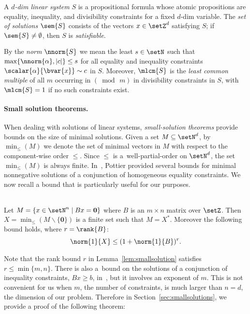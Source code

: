 A \emph{$d$-dim linear system} $S$
is a propositional formula whose atomic propositions are 
equality, inequality, and divisibility constraints for a fixed
$d$-dim variable.
The \emph{set of solutions} $\sem{S}$ 
 consists of the vectors $x\in\setZ^d$
satisfying $S$; if $\sem{S}\neq\emptyset$, then 
$S$ is \emph{satisfiable}. 

By the \emph{norm}
$\nnorm{S}$ we mean the least $s\in\setN$ such that 
$\max\{\nnorm{\alpha},|c|\}\leq s$
for all equality and inequality constraints $\scalar{\alpha}{\bvar{x}}\sim c$ in
$S$.
Moreover, $\mlcm{S}$ is the \emph{least common multiple} of all $m$
occurring in $(\bmod\, m)$ in 
divisibility constraints 
in $S$, with $\mlcm{S}=1$ if no such
constraints exist.

\paragraph{Small solution theorems.}
When dealing with solutions of linear systems, \emph{small-solution
theorems} provide bounds on the size of minimal solutions. 
Given a set $M\subseteq \setN^d$, 
by $\min_\leq(M)$ we denote the set of minimal vectors in $M$ with
respect to
the component-wise order $\leq$. Since $\leq$ is 
a~well-partial-order on $\setN^d$, the set $\min_\leq(M)$ is
always finite.
In~\cite{DBLP:conf/rta/Pottier91}, 
Pottier provided several
bounds for minimal
nonnegative solutions of a conjunction of homogeneous equality constraints. 
We now recall a bound that is particularly useful for our purposes.


\begin{lemC}\label{lem:smallsolution}
\hfill\\	
  Let $M=\{x\in\setN^n \mid Bx=\mathbf{0}\}$ where $B$ is an $m\times n$
	matrix over $\setZ$. Then
	$X=\min_{\leq}(M\smallsetminus\{\mathbf{0}\})$ is a finite set
	such that $M=X^*$. Moreover the following bound holds, where
	$r=\rank{B}$:
\begin{equation*}
\norm{1}{X}\leq (1+\norm{1}{B})^r.
\end{equation*}
\end{lemC}

\noindent
Note that the rank bound $r$ in
Lemma~\ref{lem:smallsolution} satisfies $r\leq\min\{m,n\}$.
There is also a~bound on the
solutions of a conjunction of inequality constraints, 
$Bx\geq b$, in~\cite{DBLP:conf/rta/Pottier91}, but it involves an exponent
of $m$. This is not convenient for us when $m$, the number of
constraints, is much larger than $n=d$, the dimension of our problem.
Therefore in Section~\ref{sec:smallsolutions}, we provide a proof of
the following theorem:


